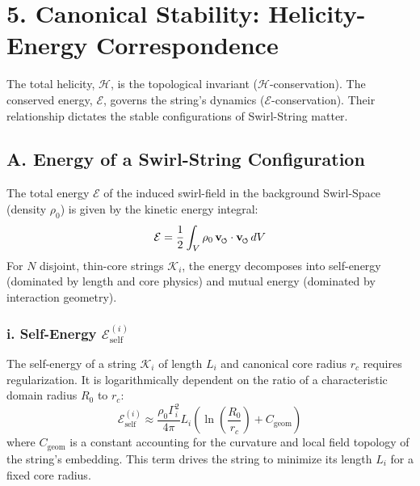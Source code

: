 \documentclass[aps,prb,amsmath,amssymb]{revtex4-2} %
\newcommand{\swirlarrow}{%
    \mathchoice{\mkern-2mu\boldsymbol{\circlearrowleft}}%
    {\mkern-2mu\boldsymbol{\circlearrowleft}}%
    {\mkern-2mu\scriptscriptstyle\boldsymbol{\circlearrowleft}}%
    {\mkern-2mu\scriptscriptstyle\boldsymbol{\circlearrowleft}}%
}
\newcommand{\vswirl}{\mathbf{v}_{\swirlarrow}}                %
\newcommand{\vv}{\vswirl}                                     %
\newcommand{\Hcal}{\mathcal{H}}         %
\begin{document}
    \section*{5. Canonical Stability: Helicity-Energy Correspondence}
            \label{sec:energy}


        The total helicity, $\Hcal$, is the topological invariant ($\Hcal$-conservation). The conserved energy, $\mathcal{E}$, governs the string's dynamics ($\mathcal{E}$-conservation). Their relationship dictates the stable configurations of Swirl-String matter.

        \subsection*{A. Energy of a Swirl-String Configuration}
            The total energy $\mathcal{E}$ of the induced swirl-field in the background Swirl-Space (density $\rho_0$) is given by the kinetic energy integral:
            \begin{equation}
                \mathcal{E} = \frac{1}{2} \int_V \rho_0 \, \vv \cdot \vv \, dV
            \end{equation}
            For $N$ disjoint, thin-core strings $\mathcal{K}_i$, the energy decomposes into self-energy (dominated by length and core physics) and mutual energy (dominated by interaction geometry).

            \subsubsection*{i. Self-Energy $\mathcal{E}_{\text{self}}^{(i)}$}
                The self-energy of a string $\mathcal{K}_i$ of length $L_i$ and canonical core radius $r_c$ requires regularization. It is logarithmically dependent on the ratio of a characteristic domain radius $R_0$ to $r_c$:
                \begin{equation}
                    \mathcal{E}_{\text{self}}^{(i)} \approx \frac{\rho_0 \Gamma_i^2}{4\pi} L_i \left( \ln\left(\frac{R_0}{r_c}\right) + C_{\text{geom}} \right)
                \end{equation}
                where $C_{\text{geom}}$ is a constant accounting for the curvature and local field topology of the string's embedding. This term drives the string to minimize its length $L_i$ for a fixed core radius.
\end{document}
